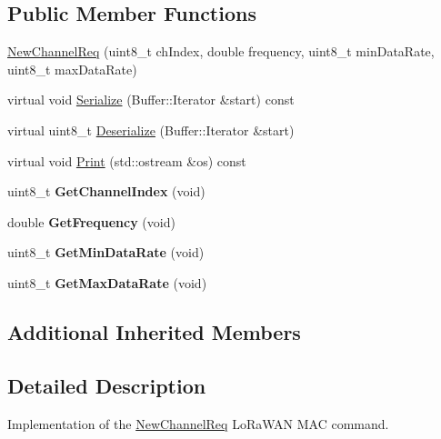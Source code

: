 \subsection*{Public Member Functions}
\begin{DoxyCompactItemize}
\item 
\hyperlink{classns3_1_1lorawan_1_1NewChannelReq_ac9b80e4338cce4c29c01f6c0c1d0a9e9}{New\+Channel\+Req} (uint8\+\_\+t ch\+Index, double frequency, uint8\+\_\+t min\+Data\+Rate, uint8\+\_\+t max\+Data\+Rate)
\item 
virtual void \hyperlink{classns3_1_1lorawan_1_1NewChannelReq_aa61501c0d31796aea70b93b011b3a0ee}{Serialize} (Buffer\+::\+Iterator \&start) const
\item 
virtual uint8\+\_\+t \hyperlink{classns3_1_1lorawan_1_1NewChannelReq_a133e0fa9c46335f9ccfd35a1bf3cfdf3}{Deserialize} (Buffer\+::\+Iterator \&start)
\item 
virtual void \hyperlink{classns3_1_1lorawan_1_1NewChannelReq_af60960cdfafc846b66a657a25678f90e}{Print} (std\+::ostream \&os) const
\item 
\mbox{\label{classns3_1_1lorawan_1_1NewChannelReq_a48fcdf496b74875aaefc943e8c66a06d}} 
uint8\+\_\+t {\bfseries Get\+Channel\+Index} (void)
\item 
\mbox{\label{classns3_1_1lorawan_1_1NewChannelReq_a6bbce5a0046d5fe7bfcf06ab3b3739f6}} 
double {\bfseries Get\+Frequency} (void)
\item 
\mbox{\label{classns3_1_1lorawan_1_1NewChannelReq_ad5b0f00a54589a370c8761b3b8297bad}} 
uint8\+\_\+t {\bfseries Get\+Min\+Data\+Rate} (void)
\item 
\mbox{\label{classns3_1_1lorawan_1_1NewChannelReq_aa5b556fa35b948723732b1ff399247df}} 
uint8\+\_\+t {\bfseries Get\+Max\+Data\+Rate} (void)
\end{DoxyCompactItemize}
\subsection*{Additional Inherited Members}


\subsection{Detailed Description}
Implementation of the \hyperlink{classns3_1_1lorawan_1_1NewChannelReq}{New\+Channel\+Req} Lo\+Ra\+W\+AN M\+AC command. 


